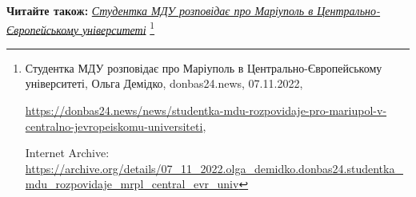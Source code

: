  
 
 
 
 

\textbf{Читайте також:} \href{https://archive.org/details/07_11_2022.olga_demidko.donbas24.studentka_mdu_rozpovidaje_mrpl_central_evr_univ}{\emph{Студентка МДУ розповідає про Маріуполь в Центрально-Європейському університеті}}%
\footnote{Студентка МДУ розповідає про Маріуполь в Центрально-Європейському університеті, Ольга Демідко, donbas24.news, 07.11.2022, \par%
\url{https://donbas24.news/news/studentka-mdu-rozpovidaje-pro-mariupol-v-centralno-jevropeiskomu-universiteti}, \par%
Internet Archive: \url{https://archive.org/details/07_11_2022.olga_demidko.donbas24.studentka_mdu_rozpovidaje_mrpl_central_evr_univ}%
}
